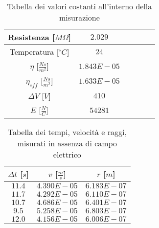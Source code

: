 \documentclass{article}
\begin{document}
\begin{multicols}{2}

\begin{table}[H]
	\centering
	\begin{tabular}{| c | c | c | c | c | c |}
		\hline
		Resistenza [$M\Omega$] & $2.029$\\
		\hline
		Temperatura [$^\circ C$]& $24$\\
		\hline
		$\eta$ [$\frac{Ns}{m^2}$] & $1.843E-05$\\
		\hline
		$\eta_{eff}$ [$\frac{Ns}{m^2}$] & $1.633E-05$\\
		\hline
		$\Delta V$ [$V$] & $410$\\
		\hline
		$E$ [$\frac N C$] & $54281$\\
		\hline
	\end{tabular}
	\caption{Tabella dei valori costanti all'interno della misurazione}
	\label{}
\end{table}

\columnbreak

\begin{table}[H]
	\centering
	\begin{tabular}{| c | c | c |}
		\hline
		$\Delta t$ [$s$] & $v$ [$\frac ms$] & $r$ [$m$] \\
		\hline
		$11.4$ & $4.390E-05$ & $6.183E-07$ \\
		$11.7$ & $4.292E-05$ & $6.110E-07$ \\
		$10.7$ & $4.686E-05$ & $6.401E-07$ \\
		$9.5$ & $5.258E-05$ & $6.803E-07$ \\
		$12.0$ & $4.156E-05$ & $6.006E-07$ \\
		\hline
	\end{tabular}
	\caption{Tabella dei tempi, velocità e raggi, misurati in assenza di campo elettrico}
	\label{}
\end{table}
	
\end{multicols}
\end{document}
